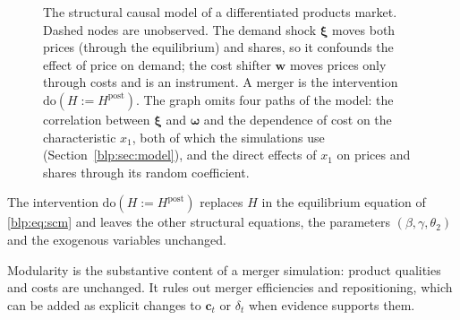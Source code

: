 \begin{figure}[htbp]
\centering
{}
\caption{The structural causal model of a differentiated products market. Dashed nodes are
unobserved. The demand shock $\bm\xi$ moves both prices (through the equilibrium) and shares, so
it confounds the effect of price on demand; the cost shifter $\bm w$ moves prices only through
costs and is an instrument. A merger is the intervention $\mathrm{do}(H := H^{\mathrm{post}})$. The graph omits four paths of the model: the correlation between $\bm\xi$ and $\bm\omega$ and the dependence of cost on the characteristic $x_1$, both of which the simulations use (Section~\ref{blp:sec:model}), and the direct effects of $x_1$ on prices and shares through its random coefficient.}
\label{blp:fig:dag}
\end{figure}

\begin{assumption}[Modularity]\label{blp:ass:mod}
The intervention $\mathrm{do}(H := H^{\mathrm{post}})$ replaces $H$ in the equilibrium equation of
\eqref{blp:eq:scm} and leaves the other structural equations, the parameters $(\beta,\gamma,\theta_2)$
and the exogenous variables unchanged.
\end{assumption}

Modularity is the substantive content of a merger simulation: product qualities and costs are unchanged. It rules out merger efficiencies and repositioning, which can be added as explicit changes to $\bm c_t$ or $\delta_t$ when evidence supports them.



